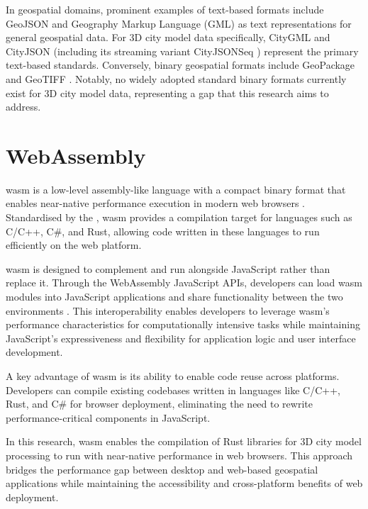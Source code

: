 In geospatial domains, prominent examples of text-based formats include GeoJSON \citep{geojson} and Geography Markup Language (GML) \citep{gml} as text representations for general geospatial data. For 3D city model data specifically, CityGML \citep{CityGML} and CityJSON \citep{cityjson} (including its streaming variant CityJSONSeq \citep{ledoux_2024}) represent the primary text-based standards. Conversely, binary geospatial formats include GeoPackage \citep{geopackage} and GeoTIFF \citep{geotiff}. Notably, no widely adopted standard binary formats currently exist for 3D city model data, representing a gap that this research aims to address.

\section{WebAssembly}
\label{tb:webassembly}
\ac{wasm} is a low-level assembly-like language with a compact binary format that enables near-native performance execution in modern web browsers \citep{WebAssembly}. Standardised by the \citet{WebAssemblyCoreSpecification1, WebAssemblyCoreSpecification2}, \ac{wasm} provides a compilation target for languages such as C/C++, C\#, and Rust, allowing code written in these languages to run efficiently on the web platform.

\ac{wasm} is designed to complement and run alongside JavaScript rather than replace it. Through the WebAssembly JavaScript APIs, developers can load \ac{wasm} modules into JavaScript applications and share functionality between the two environments \citep{WebAssembly}. This interoperability enables developers to leverage \ac{wasm}'s performance characteristics for computationally intensive tasks while maintaining JavaScript's expressiveness and flexibility for application logic and user interface development.

A key advantage of \ac{wasm} is its ability to enable code reuse across platforms. Developers can compile existing codebases written in languages like C/C++, Rust, and C\# for browser deployment, eliminating the need to rewrite performance-critical components in JavaScript.

In this research, \ac{wasm} enables the compilation of Rust libraries for 3D city model processing to run with near-native performance in web browsers. This approach bridges the performance gap between desktop and web-based geospatial applications while maintaining the accessibility and cross-platform benefits of web deployment.

